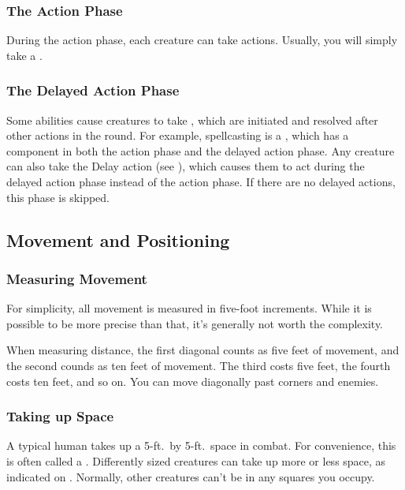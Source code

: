         \subsubsection{The Action Phase}\label{The Action Phase}
            During the action phase, each creature can take actions.
            Usually, you will simply take a .

        \subsubsection{The Delayed Action Phase}\label{The Delayed Action Phase}
            Some abilities cause creatures to take , which are initiated and resolved after other actions in the round.
            For example, spellcasting is a , which has a component in both the action phase and the delayed action phase.
            Any creature can also take the Delay action (see ), which causes them to act during the delayed action phase instead of the action phase.
            If there are no delayed actions, this phase is skipped.

    \subsection{Movement and Positioning}

        \subsubsection{Measuring Movement}

            For simplicity, all movement is measured in five-foot increments.
            While it is possible to be more precise than that, it's generally not worth the complexity.

             When measuring distance, the first diagonal counts as five feet of movement, and the second counds as ten feet of movement.
            The third costs five feet, the fourth costs ten feet, and so on.
            You can move diagonally past corners and enemies.

        \subsubsection{Taking up Space}
            A typical human takes up a 5-ft.\ by 5-ft.\ space in combat.
            For convenience, this is often called a .
            Differently sized creatures can take up more or less space, as indicated on .
            Normally, other creatures can't be in any squares you occupy.

